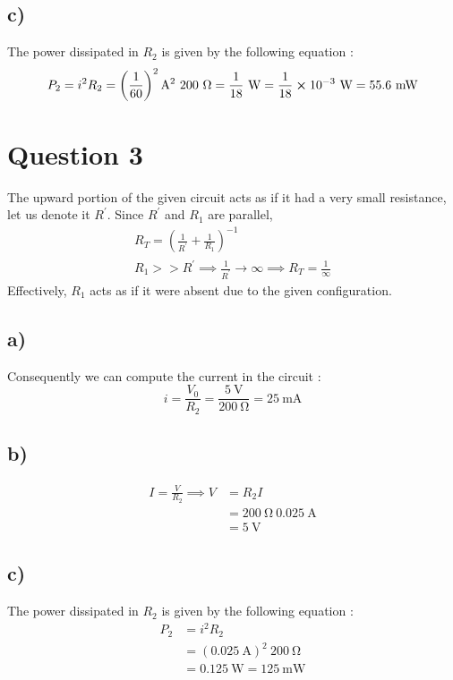 \documentclass[
	12pt,
	]{article}
\theoremstyle{definition}
\theoremstyle{definition}
\theoremstyle{definition}
\theoremstyle{definition}
\theoremstyle{definition}
\theoremstyle{example}
\theoremstyle{note}
\theoremstyle{remark}
\theoremstyle{example}
\begin{document}
		 	\subsection{c) }
		 		The power dissipated in $R_{2}$ is given by the following equation : 
		 		 $$ P_{2} = i^{2} R_{2} = \left(\frac{1}{60}\right)^{2} \si{\ampere\squared} \ 200 \ \si{\ohm} =  \frac{1}{18} \ \si{\watt} = \frac{1}{18} \cross 10^{-3} \ \si{\watt} = 55.6 \ \si{\milli\watt} $$
		 \section{Question 3}
		 	The upward portion of the given circuit acts as if it had a very small resistance, let us denote it $R^{\prime}$. Since $R^{\prime}$ and $R_{1}$ are parallel,
		 	\begin{gather*}
		 		R_{T} = \left(\frac{1}{R^{\prime}} + \frac{1}{R_{1}}\right)^{-1}\\
		 	    R_{1} >> R^{\prime} \implies \frac{1}{R^{\prime}} \to \infty \implies R_{T} = \frac{1}{\infty}	
		 	\end{gather*} 
		 	Effectively, $R_{1}$ acts as if it were absent due to the given configuration.\\
		 	\subsection{a) }
		 		Consequently we can compute the current in the circuit :  
		 			$$ i = \frac{V_{0}}{R_{2}} = \frac{5 \ \si{\volt}}{200 \ \si{\ohm}} = 25 \ \si{\milli\ampere}$$
		 	\subsection{b) }
		 		\begin{align*}
		 			I  = \frac{V}{R_{2}} \implies V &= R_{2}I \\
		 			&= 200 \ \si{\ohm} \ 0.025 \ \si{\ampere} \\
		 			&=  5 \ \si{\volt}
		 		\end{align*} 
		 	\subsection{c) }
		 		The power dissipated in $R_{2}$ is given by the following equation : 
		 		\begin{align*}
		 			 P_{2} &= i^{2} R_{2}\\
		 			 &= (0.025 \ \si{\ampere})^{2} \ 200 \ \si{\ohm}  \\
		 			 &= 0.125 \ \si{\watt} = 125 \ \si{\milli\watt}
		 		\end{align*}
\end{document}
